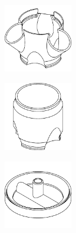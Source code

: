 \begin{center}
    \begin{minipage}{0.3\textwidth}
        \centering
        \includegraphics[height=3cm]{images/wireframes/50mm_module.png}
    \end{minipage}
    \hfill
    \begin{minipage}{0.3\textwidth}
        \centering
        \includegraphics[height=3cm]{images/wireframes/50mm_chimney.png}
    \end{minipage}
    \hfill
    \begin{minipage}{0.3\textwidth}
        \centering
        \includegraphics[height=3cm]{images/wireframes/50mm_shower_head.png}
    \end{minipage}



\end{center}
